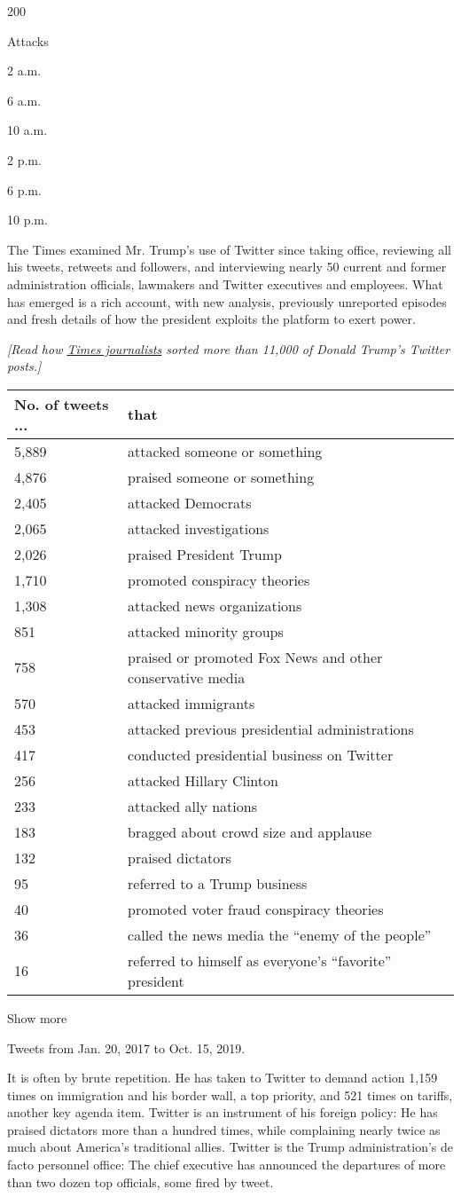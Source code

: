 200

Attacks

2 a.m.

6 a.m.

10 a.m.

2 p.m.

6 p.m.

10 p.m.

The Times examined Mr. Trump's use of Twitter since taking office,
reviewing all his tweets, retweets and followers, and interviewing
nearly 50 current and former administration officials, lawmakers and
Twitter executives and employees. What has emerged is a rich account,
with new analysis, previously unreported episodes and fresh details of
how the president exploits the platform to exert power.

\emph{{[}Read how
\href{https://www.nytimes.com/2019/11/02/insider/trump-twitter-data.html}{Times
journalists} sorted more than 11,000 of Donald Trump's Twitter
posts.{]}}

\begin{longtable}[]{@{}ll@{}}
\toprule
\textbf{No. of tweets ...} & \textbf{that}\tabularnewline
\midrule
\endhead
5,889 & attacked someone or something\tabularnewline
4,876 & praised someone or something\tabularnewline
2,405 & attacked Democrats\tabularnewline
2,065 & attacked investigations\tabularnewline
2,026 & praised President Trump\tabularnewline
1,710 & promoted conspiracy theories\tabularnewline
1,308 & attacked news organizations\tabularnewline
851 & attacked minority groups\tabularnewline
758 & praised or promoted Fox News and other conservative
media\tabularnewline
570 & attacked immigrants\tabularnewline
453 & attacked previous presidential administrations\tabularnewline
417 & conducted presidential business on Twitter\tabularnewline
256 & attacked Hillary Clinton\tabularnewline
233 & attacked ally nations\tabularnewline
183 & bragged about crowd size and applause\tabularnewline
132 & praised dictators\tabularnewline
95 & referred to a Trump business\tabularnewline
40 & promoted voter fraud conspiracy theories\tabularnewline
36 & called the news media the ``enemy of the people''\tabularnewline
16 & referred to himself as everyone's ``favorite''
president\tabularnewline
\bottomrule
\end{longtable}

Show more

Tweets from Jan. 20, 2017 to Oct. 15, 2019.

It is often by brute repetition. He has taken to Twitter to demand
action 1,159 times on immigration and his border wall, a top priority,
and 521 times on tariffs, another key agenda item. Twitter is an
instrument of his foreign policy: He has praised dictators more than a
hundred times, while complaining nearly twice as much about America's
traditional allies. Twitter is the Trump administration's de facto
personnel office: The chief executive has announced the departures of
more than two dozen top officials, some fired by tweet.

